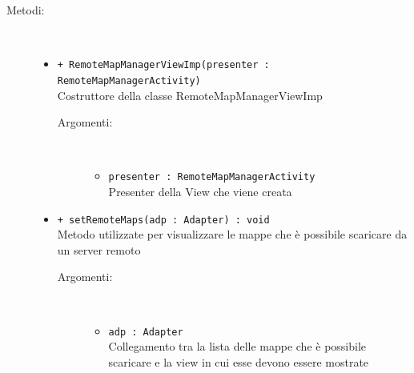 \documentclass[../DefinizioneDiProdotto.tex]{subfiles}
\begin{document}
\begin{description}
\begin{itemize}
\end{itemize}
\item[Metodi:] \
\begin{itemize}
\item \texttt{+ RemoteMapManagerViewImp(presenter : RemoteMapManagerActivity)}\\
Costruttore della classe RemoteMapManagerViewImp
 \begin{description}
\item[Argomenti:] \
\begin{itemize}
\item \texttt{presenter : RemoteMapManagerActivity}\\
Presenter della View che viene creata\end{itemize}
\end{description}
\item \texttt{+ setRemoteMaps(adp : Adapter) : void}\\
Metodo utilizzate per visualizzare le mappe che è possibile scaricare da un server remoto
 \begin{description}
\item[Argomenti:] \
\begin{itemize}
\item \texttt{adp : Adapter}\\
Collegamento tra la lista delle mappe che è possibile scaricare e la view in cui esse devono essere mostrate\end{itemize}
\end{description}
\end{itemize}
\end{description}
 
	
	
\end{document}

